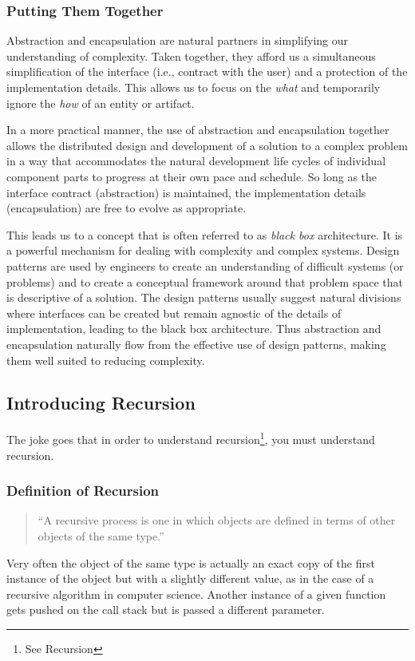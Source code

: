 \documentclass[jou,apacite]{apa6}
\begin{document}
\subsubsection{Putting Them Together}
Abstraction and encapsulation are natural partners in simplifying our understanding of complexity.  Taken together, they afford us a simultaneous simplification of the interface (i.e., contract with the user) and a protection of the implementation details.  This allows us to focus on the \emph{what} and temporarily ignore the \emph{how} of an entity or artifact.

In a more practical manner, the use of abstraction and encapsulation together allows the distributed design and development of a solution to a complex problem in a way that accommodates the natural development life cycles of individual component parts to progress at their own pace and schedule.  So long as the interface contract (abstraction) is maintained, the implementation details (encapsulation) are free to evolve as appropriate.

This leads us to a concept that is often referred to as \emph{black box} architecture.  It is a powerful mechanism for dealing with complexity and complex systems.  Design patterns are used by engineers to create an understanding of difficult systems (or problems) and to create a conceptual framework around that problem space that is descriptive of a solution.  The design patterns usually suggest natural divisions where interfaces can be created but remain agnostic of the details of implementation, leading to the black box architecture.  Thus abstraction and encapsulation naturally flow from the effective use of design patterns, making them well suited to reducing complexity.

\subsection{Introducing Recursion}  %
The joke goes that in order to understand recursion\footnote{See Recursion}, you must understand recursion.

\subsubsection{Definition of Recursion} %
    \begin{quote}
      ``A recursive process is one in which objects are defined in terms of other objects of the same type.''~\cite{Wolfram} 
    \end{quote}
    Very often the object of the same type is actually an exact copy of the first instance of the object but with a slightly different value, as in the case of a recursive algorithm in computer science.  Another instance of a given function gets pushed on the call stack but is passed a different parameter.
\end{document}
